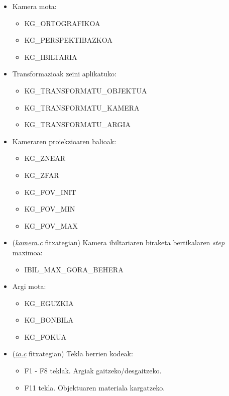 \documentclass[12pt]{article}
\newcommand{\fitxategi}[1] {\underline{\textit{#1}}}
\begin{document}
\begin{itemize}
\item Kamera mota:
\begin{itemize}
\item KG\_ORTOGRAFIKOA
\item KG\_PERSPEKTIBAZKOA
\item KG\_IBILTARIA
\end{itemize}

\item Transformazioak zeini aplikatuko:
\begin{itemize}
\item KG\_TRANSFORMATU\_OBJEKTUA
\item KG\_TRANSFORMATU\_KAMERA
\item KG\_TRANSFORMATU\_ARGIA
\end{itemize}

\item Kameraren proiekzioaren balioak:
\begin{itemize}
\item KG\_ZNEAR
\item KG\_ZFAR
\item KG\_FOV\_INIT
\item KG\_FOV\_MIN
\item KG\_FOV\_MAX
\end{itemize}

\item (\fitxategi{kamera.c} fitxategian) Kamera ibiltariaren biraketa bertikalaren \textit{step} maximoa:
\begin{itemize}
\item IBIL\_MAX\_GORA\_BEHERA
\end{itemize}

\item Argi mota:
\begin{itemize}
\item KG\_EGUZKIA
\item KG\_BONBILA
\item KG\_FOKUA
\end{itemize}

\item (\fitxategi{io.c} fitxategian) Tekla berrien kodeak:
\begin{itemize}
\item F1 - F8 teklak. Argiak gaitzeko/desgaitzeko.
\item F11 tekla. Objektuaren materiala kargatzeko.
\end{itemize}

\end{itemize}
\end{document}
